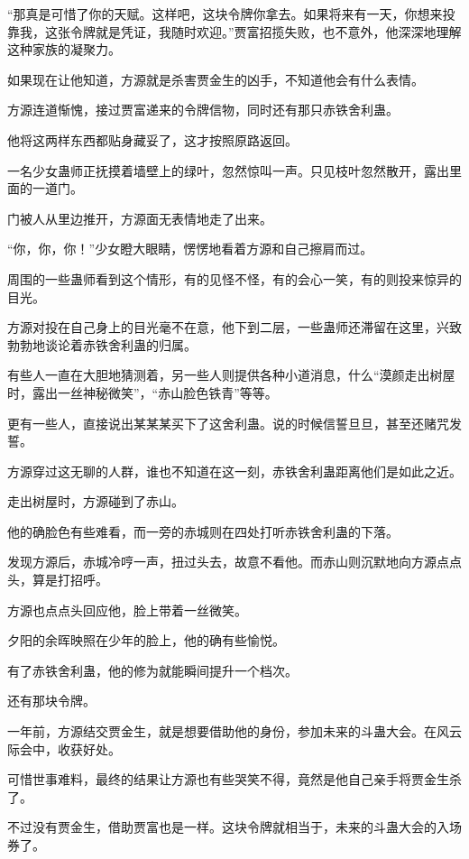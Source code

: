 \begin{this_body}
“那真是可惜了你的天赋。这样吧，这块令牌你拿去。如果将来有一天，你想来投靠我，这张令牌就是凭证，我随时欢迎。”贾富招揽失败，也不意外，他深深地理解这种家族的凝聚力。

如果现在让他知道，方源就是杀害贾金生的凶手，不知道他会有什么表情。

方源连道惭愧，接过贾富递来的令牌信物，同时还有那只赤铁舍利蛊。

他将这两样东西都贴身藏妥了，这才按照原路返回。

一名少女蛊师正抚摸着墙壁上的绿叶，忽然惊叫一声。只见枝叶忽然散开，露出里面的一道门。

门被人从里边推开，方源面无表情地走了出来。

“你，你，你！”少女瞪大眼睛，愣愣地看着方源和自己擦肩而过。

周围的一些蛊师看到这个情形，有的见怪不怪，有的会心一笑，有的则投来惊异的目光。

方源对投在自己身上的目光毫不在意，他下到二层，一些蛊师还滞留在这里，兴致勃勃地谈论着赤铁舍利蛊的归属。

有些人一直在大胆地猜测着，另一些人则提供各种小道消息，什么“漠颜走出树屋时，露出一丝神秘微笑”，“赤山脸色铁青”等等。

更有一些人，直接说出某某某买下了这舍利蛊。说的时候信誓旦旦，甚至还赌咒发誓。

方源穿过这无聊的人群，谁也不知道在这一刻，赤铁舍利蛊距离他们是如此之近。

走出树屋时，方源碰到了赤山。

他的确脸色有些难看，而一旁的赤城则在四处打听赤铁舍利蛊的下落。

发现方源后，赤城冷哼一声，扭过头去，故意不看他。而赤山则沉默地向方源点点头，算是打招呼。

方源也点点头回应他，脸上带着一丝微笑。

夕阳的余晖映照在少年的脸上，他的确有些愉悦。

有了赤铁舍利蛊，他的修为就能瞬间提升一个档次。

还有那块令牌。

一年前，方源结交贾金生，就是想要借助他的身份，参加未来的斗蛊大会。在风云际会中，收获好处。

可惜世事难料，最终的结果让方源也有些哭笑不得，竟然是他自己亲手将贾金生杀了。

不过没有贾金生，借助贾富也是一样。这块令牌就相当于，未来的斗蛊大会的入场券了。

\end{this_body}

